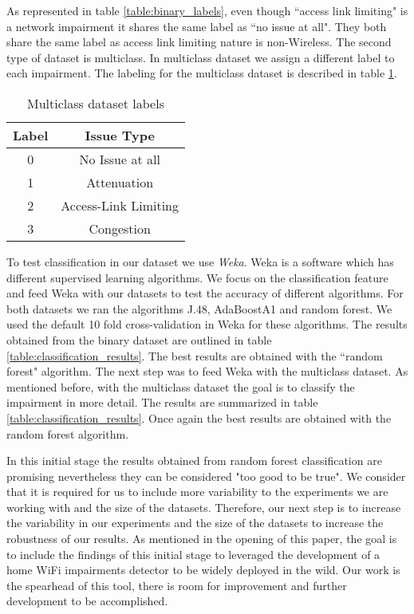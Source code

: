 As represented in table \ref{table:binary_labels}, even though ``access link limiting" is a network impairment it shares the same label as ``no issue at all". They both share the same label as access link limiting nature is non-Wireless.
The second type of dataset is multiclass. In multiclass dataset we assign a different label to each impairment. The labeling for the multiclass dataset is described in table \ref{table:multiclass_labels}.

\begin{table}[!h]
	\begin{center}
		\begin{tabular}{||c c||} 
			\hline
			Label & Issue Type\\ [0.5ex] 
			\hline\hline
			0 & No Issue at all \\ 
			\hline
			1 & Attenuation\\
			\hline
			2 & Access-Link Limiting \\
			\hline
			3 & Congestion \\[1ex] 
			\hline
		\end{tabular}
		\caption{Multiclass dataset labels}
		\label{table:multiclass_labels}
	\end{center}
\end{table}

To test classification in our dataset we use \emph{Weka}. Weka is a software which has different supervised learning algorithms. We focus on the classification feature and feed Weka with our datasets to test the accuracy of different algorithms. For both datasets we ran the algorithms J.48, AdaBoostA1 and random forest. We used the default 10 fold cross-validation in Weka for these algorithms. The results obtained from the binary dataset are outlined in table \ref{table:classification_results}. The best results are obtained with the ``random forest" algorithm. The next step was to feed Weka with the multiclass dataset. As mentioned before, with the multiclass dataset the goal is to classify the impairment in more detail. The results are summarized in table \ref{table:classification_results}. Once again the best results are obtained with the random forest algorithm. 

In this initial stage the results obtained from random forest classification are promising nevertheless they can be considered "too good to be true". We consider that it is required for us to include more variability to the experiments we are working with and the size of the datasets. Therefore, our next step is to increase the variability in our experiments and the size of the datasets to increase the robustness of our results. As mentioned in the opening of this paper, the goal is to include the findings of this initial stage to leveraged the development of a home WiFi impairments detector to be widely deployed in the wild. Our work is the spearhead of this tool, there is room for improvement and further development to be accomplished.


